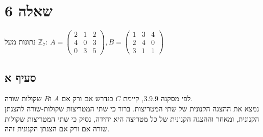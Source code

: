 \documentclass{article}
\begin{document}
\pagebreak

\section*{שאלה 6}

נתונות מעל $\mathbb{Z}_7$:
$
    A = \begin{pmatrix}
        2 & 1 & 2 \\
        4 & 0 & 3 \\
        0 & 3 & 5
    \end{pmatrix},
    B = \begin{pmatrix}
        1 & 3 & 4 \\
        2 & 4 & 0 \\
        3 & 1 & 1
    \end{pmatrix}
$

\subsection*{סעיף א}

לפי מסקנה $3.9.9$,
קיימת $C$
כנדרש אם ורק אם $A$ ו$B$ שקולות שורה.\\
נמצא את ההצגה הקנונית של שתי המטריצות. ברור כי שתי המטריצות שקולות-שורה להצגתן הקנונית,
ומאחר וההצגה הקנונית של כל מטריצה היא יחידה, נסיק כי שתי המטריצות שקולות שורה אם ורק אם הצגתן הקנונית זהה.
\end{document}
